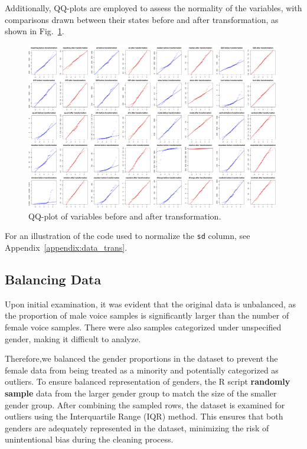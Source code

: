 \documentclass{article}
\begin{document}
	Additionally, QQ-plots are employed to assess the normality of the variables, with comparisons drawn between their states before and after transformation, as shown in Fig.~\ref{transformation_qq}.
	\begin{figure}
		\centering
		\includegraphics[width=\textwidth]{graphs/transformations_qq.pdf}
		\caption{QQ-plot of variables before and after transformation.}
		\label{transformation_qq}
	\end{figure}
	
	For an illustration of the code used to normalize the \texttt{sd} column, see Appendix~\ref{appendix:data_trans}.	
	
	\subsection{Balancing Data}
	Upon initial examination, it was evident that the original data is unbalanced, as the proportion of male voice samples is significantly larger than the number of female voice samples. There were also samples categorized under unspecified gender, making it difficult to analyze. 
	
	Therefore,we balanced the gender proportions in the dataset to prevent the female data from being treated as a minority and potentially categorized as outliers. To ensure balanced representation of genders, the R script \textbf{randomly sample} data from the larger gender group to match the size of the smaller gender group. After combining the sampled rows, the dataset is examined for outliers using the Interquartile Range (IQR) method. This ensures that both genders are adequately represented in the dataset, minimizing the risk of unintentional bias during the cleaning process. 
	
\end{document}
